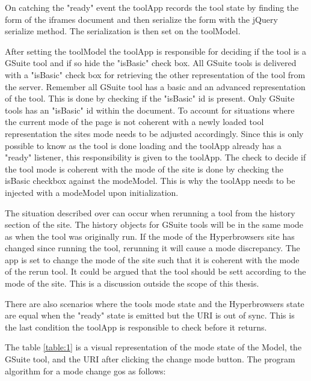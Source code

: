 \documentclass[english]{ifimaster}
\begin{document}
On catching the "ready" event the toolApp records the tool state by finding the form of the iframes document and then serialize the form with the jQuery serialize method. The serialization is then set on the toolModel.

After setting the toolModel the toolApp is responsible for deciding if the tool is a GSuite tool and if so hide the "isBasic" check box. All GSuite tools is delivered with a "isBasic" check box for retrieving the other representation of the tool from the server. Remember all GSuite tool has a basic and an advanced representation of the tool. This is done by checking if the "isBasic" id is present. Only GSuite tools has an "isBasic" id within the document. 
\label{sec:gsuiteMode}
To account for situations where the current mode of the page is not coherent with a newly loaded tool representation the sites mode needs to be adjusted accordingly. Since this is only possible to know as the tool is done loading and the toolApp already has a "ready" listener, this responsibility is given to the toolApp. The check to decide if the tool mode is coherent with the mode of the site is done by checking the isBasic checkbox against the modeModel. This is why the toolApp needs to be injected with a modeModel upon initialization. 

The situation described over can occur when rerunning a tool from the history section of the site. The history objects for GSuite tools will be in the same mode as when the tool was originally run. If the mode of the Hyperbrowsers site has changed since running the tool, rerunning it will cause a mode discrepancy. The app is set to change the mode of the site such that it is coherent with the mode of the rerun tool. It could be argued that the tool should be sett according to the mode of the site. This is a discussion outside the scope of this thesis.

There are also scenarios where the tools mode state and the Hyperbrowsers state are equal when the "ready" state is emitted but the URI is out of sync. This is the last condition the toolApp is responsible to check before it returns.


The table \ref{table:1} is a visual representation of the mode state of the Model, the GSuite tool, and the URI after clicking the change mode button. The program algorithm for a mode change gos as follows:
\end{document}
